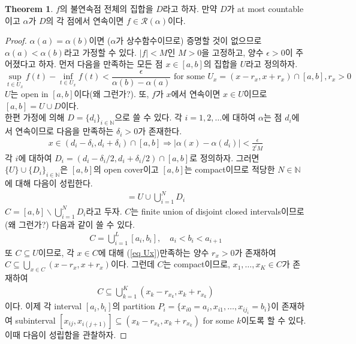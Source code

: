 \documentclass[12pt]{article}
\theoremstyle{definition}
\newtheorem{thm}{Theorem}[section]
\def\NN{\mathbb{N}}
\def\eps{\epsilon}
\def\calR{\mathcal{R}}
\newcommand{\abs}[1]{\left\vert#1\right\vert}
\begin{document}
\begin{thm} \label{thm disconti int}
	\(f\)의 불연속점 전체의 집합을 \(D\)라고 하자. 만약 \(D\)가 at most countable이고 \(\alpha\)가 \(D\)의 각 점에서 연속이면 \(f \in \calR(\alpha)\)이다.
\end{thm}
\begin{proof}
	\(\alpha(a) = \alpha(b)\)이면 (\(\alpha\)가 상수함수이므로) 증명할 것이 없으므로 \(\alpha(a) < \alpha(b)\)라고 가정할 수 있다. \(\abs{f} < M\)인 \(M > 0\)을 고정하고, 양수 \(\eps > 0\)이 주어졌다고 하자. 먼저 다음을 만족하는 모든 점 \(x \in [a, b]\)의 집합을 \(U\)라고 정의하자.
	\begin{equation} \label{eq Ux}
		\sup_{t \in U_x}f(t) - \inf_{t \in U_x}f(t) < \frac{\eps}{\alpha(b) - \alpha(a)} \text{ for some } U_x = (x - r_x, x + r_x) \cap [a, b], r_x > 0
	\end{equation}
	\(U\)는 open in \([a, b]\)이다(왜 그런가?). 또, \(f\)가 \(x\)에서 연속이면 \(x \in U\)이므로 \([a, b] = U \cup D\)이다.\\
	한편 가정에 의해 \(D = \{d_i\}_{i \in \NN}\)으로 쓸 수 있다. 각 \(i = 1, 2,\ldots\)에 대하여 \(\alpha\)는 점 \(d_i\)에서 연속이므로 다음을 만족하는 \(\delta_i > 0\)가 존재한다.
	\begin{gather*}
		x \in (d_i - \delta_i, d_i + \delta_i) \cap [a, b] \Longrightarrow \abs{\alpha(x) - \alpha(d_i)} < \frac{\eps}{2^{i}M}
	\end{gather*}
	각 \(i\)에 대하여 \(D_i = (d_i - \delta_i/2, d_i + \delta_i/2) \cap [a, b]\)로 정의하자. 그러면 \(\{U\} \cup \{D_i\}_{i \in \NN}\)은 \([a, b]\)의 open cover이고 \([a, b]\)는 compact이므로 적당한 \(N \in \NN\)에 대해 다음이 성립한다.
	\begin{gather*}
		[a, b] = U \cup \bigcup_{i=1}^N D_i
	\end{gather*}
	\(C = [a, b] \backslash \bigcup_{i=1}^N D_i\)라고 두자. \(C\)는 finite union of disjoint closed intervals이므로(왜 그런가?) 다음과 같이 쓸 수 있다.
	\begin{gather*}
		C = \bigcup_{i=1}^{L} [a_i, b_i], \quad a_i < b_i < a_{i+1}
	\end{gather*}
	또 \(C \subseteq U\)이므로, 각 \(x \in C\)에 대해 (\ref{eq Ux})\를 만족하는 양수 \(r_x > 0\)가 존재하여 \(C \subseteq \bigcup_{x \in C} (x - r_x, x + r_x)\)이다. 그런데 \(C\)는 compact이므로, \(x_1, \ldots, x_K \in C\)가 존재하여
	\begin{gather*}
		C \subseteq \bigcup_{k=1}^K (x_k - r_{x_k}, x_k + r_{x_k})
	\end{gather*}
	이다. 이제 각 interval \([a_i, b_i]\)의 partition \(P_i = \{x_{i0}=a_i, x_{i1}, \ldots, x_{ij_i} = b_i\}\)이 존재하여 subinterval \([x_{ij}, x_{i(j+1)}] \subseteq (x_k - r_{x_k}, x_k + r_{x_k})\) for some \(k\)이도록 할 수 있다. 이때 다음이 성립함을 관찰하자.

\end{proof}
\end{document}
